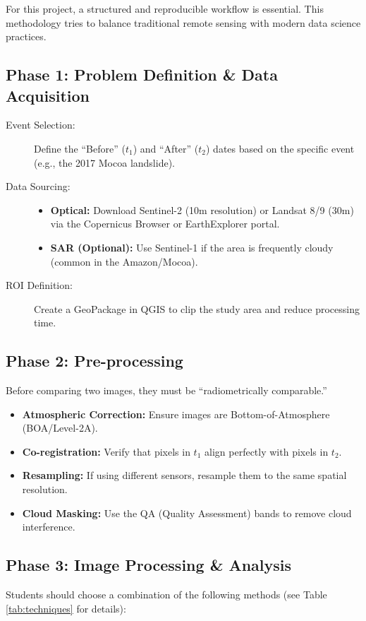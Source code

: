 \documentclass{article}
\begin{document}
For this project, a structured and reproducible workflow is essential. This methodology tries to balance traditional remote sensing with modern data science practices.

\subsection*{Phase 1: Problem Definition \& Data Acquisition}
\begin{description}
    \item[Event Selection:] Define the ``Before'' ($t_1$) and ``After'' ($t_2$) dates based on the specific event (e.g., the 2017 Mocoa landslide).
    \item[Data Sourcing:] \text{}
    \begin{itemize}
        \item \textbf{Optical:} Download Sentinel-2 (10m resolution) or Landsat 8/9 (30m) via the Copernicus Browser or EarthExplorer portal.
        \item \textbf{SAR (Optional):} Use Sentinel-1 if the area is frequently cloudy (common in the Amazon/Mocoa).
    \end{itemize}
    \item[ROI Definition:] Create a GeoPackage in QGIS to clip the study area and reduce processing time.
\end{description}

\subsection*{Phase 2: Pre-processing}
Before comparing two images, they must be ``radiometrically comparable.''
\begin{itemize}
    \item \textbf{Atmospheric Correction:} Ensure images are Bottom-of-Atmosphere (BOA/Level-2A).
    \item \textbf{Co-registration:} Verify that pixels in $t_1$ align perfectly with pixels in $t_2$.
    \item \textbf{Resampling:} If using different sensors, resample them to the same spatial resolution.
    \item \textbf{Cloud Masking:} Use the QA (Quality Assessment) bands to remove cloud interference.
\end{itemize}

\subsection*{Phase 3: Image Processing \& Analysis}
Students should choose a combination of the following methods (see Table \ref{tab:techniques} for details):
\end{document}
